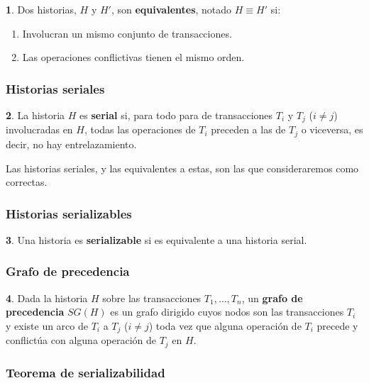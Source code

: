 \documentclass[english]{article}
\theoremstyle{definition}
\theoremstyle{definition}
\newtheorem*{defn*}{\protect\definitionname}
\providecommand{\definitionname}{Definición}
\begin{document}
\begin{defn*}
Dos historias, $H$ y $H'$, son \textbf{equivalentes}, notado $H \equiv H'$ si:

\begin{enumerate}
    \item Involucran un mismo conjunto de transacciones.
    \item Las operaciones conflictivas tienen el mismo orden.
\end{enumerate}
\end{defn*}

\subsubsection{Historias seriales}

\begin{defn*}
La historia $H$ es \textbf{serial} si, para todo para de transacciones $T_i$ y
$T_j$ ($i \not= j$) involucradas en $H$, todas las operaciones de $T_i$
preceden a las de $T_j$ o viceversa, es decir, no hay entrelazamiento.
\end{defn*}

Las historias seriales, y las equivalentes a estas, son las que consideraremos
como correctas.

\subsubsection{Historias serializables}

\begin{defn*}
Una historia es \textbf{serializable} si es equivalente a una historia serial.
\end{defn*}

\subsubsection{Grafo de precedencia}

\begin{defn*}
Dada la historia $H$ sobre las transacciones $T_1, \dots, T_n$, un
\textbf{grafo de precedencia} $SG(H)$ es un grafo dirigido cuyos nodos son las
transacciones $T_i$ y existe un arco de $T_i$ a $T_j$ ($i \not= j$) toda vez
que alguna operación de $T_i$ precede y conflictúa con alguna operación de
$T_j$ en $H$.
\end{defn*}


\subsubsection{Teorema de serializabilidad}
\end{document}
